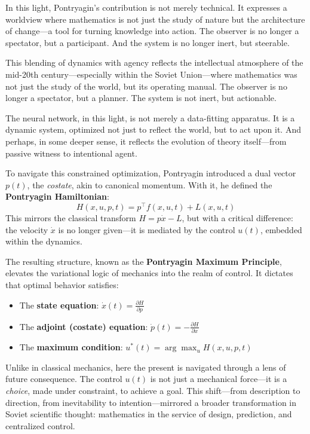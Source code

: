 In this light, Pontryagin’s contribution is not merely technical. It expresses a worldview where mathematics is not just the study of nature but the architecture of change—a tool for turning knowledge into action. The observer is no longer a spectator, but a participant. And the system is no longer inert, but steerable.


This blending of dynamics with agency reflects the intellectual atmosphere of the mid-20th century—especially within the Soviet Union—where mathematics was not just the study of the world, but its operating manual. The observer is no longer a spectator, but a planner. The system is not inert, but actionable.

The neural network, in this light, is not merely a data-fitting apparatus. It is a dynamic system, optimized not just to reflect the world, but to act upon it. And perhaps, in some deeper sense, it reflects the evolution of theory itself—from passive witness to intentional agent.

To navigate this constrained optimization, Pontryagin introduced a dual vector \( p(t) \), the \emph{costate}, akin to canonical momentum. With it, he defined the \textbf{Pontryagin Hamiltonian}:
\[
H(x, u, p, t) = p^\top f(x, u, t) + L(x, u, t)
\]
This mirrors the classical transform \( H = p \dot{x} - L \), but with a critical difference: the velocity \( \dot{x} \) is no longer given—it is mediated by the control \( u(t) \), embedded within the dynamics.

The resulting structure, known as the \textbf{Pontryagin Maximum Principle}, elevates the variational logic of mechanics into the realm of control. It dictates that optimal behavior satisfies:

\begin{itemize}
  \item The \textbf{state equation}: \( \dot{x}(t) = \frac{\partial H}{\partial p} \)
  \item The \textbf{adjoint (costate) equation}: \( \dot{p}(t) = -\frac{\partial H}{\partial x} \)
  \item The \textbf{maximum condition}: \( u^*(t) = \arg\max_u H(x, u, p, t) \)
\end{itemize}

Unlike in classical mechanics, here the present is navigated through a lens of future consequence. The control \( u(t) \) is not just a mechanical force—it is a \emph{choice}, made under constraint, to achieve a goal. This shift—from description to direction, from inevitability to intention—mirrored a broader transformation in Soviet scientific thought: mathematics in the service of design, prediction, and centralized control.

